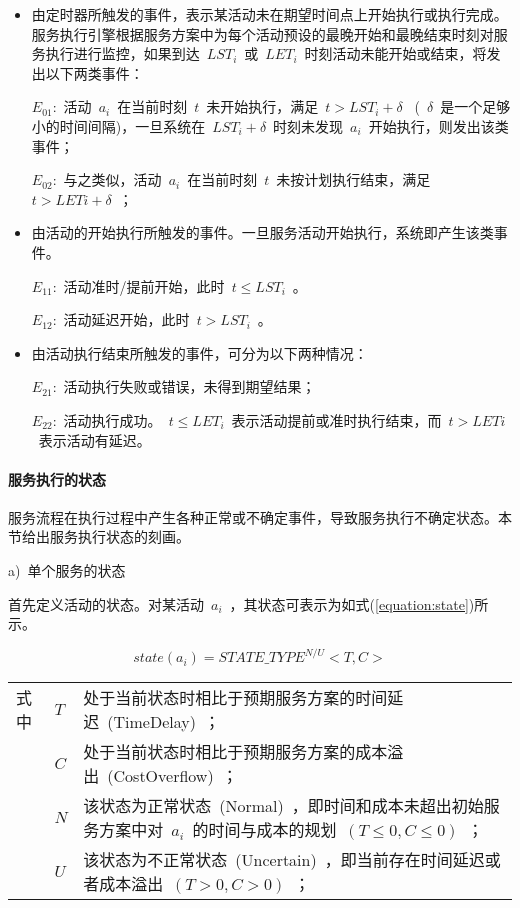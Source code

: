 \begin{itemize}
    \item 由定时器所触发的事件，表示某活动未在期望时间点上开始执行或执行完成。服务执行引擎根据服务方案中为每个活动预设的最晚开始和最晚结束时刻对服务执行进行监控，如果到达~$LST_i$~或~$LET_i$~时刻活动未能开始或结束，将发出以下两类事件：
    
    $E_{01}$:~活动~$a_i$~在当前时刻~$t$~未开始执行，满足~$t>LST_i+\delta$~ (~$\delta$~是一个足够小的时间间隔)，一旦系统在~$LST_i+\delta$~时刻未发现~$a_i$~开始执行，则发出该类事件；
    
    $E_{02}$:~与之类似，活动~$a_i$~在当前时刻~$t$~未按计划执行结束，满足~$t>LETi+\delta$~；
    
    \item 由活动的开始执行所触发的事件。一旦服务活动开始执行，系统即产生该类事件。
    
    $E_{11}$:~活动准时/提前开始，此时~$t\le LST_i$~。
    
    $E_{12}$:~活动延迟开始，此时~$t>LST_i$~。
    
    \item 由活动执行结束所触发的事件，可分为以下两种情况：
    
    $E_{21}$:~活动执行失败或错误，未得到期望结果；
    
    $E_{22}$:~活动执行成功。~$t\le LET_i$~表示活动提前或准时执行结束，而~$t>LETi$~表示活动有延迟。
    
\end{itemize}

\paragraph{服务执行的状态} \label{sec:service_state}

服务流程在执行过程中产生各种正常或不确定事件，导致服务执行不确定状态。本节给出服务执行状态的刻画。

a)~单个服务的状态

首先定义活动的状态。对某活动~$a_i$~，其状态可表示为如式(\ref{equation:state})所示。

\begin{equation}\label{equation:state}
state(a_i)=STATE\_TYPE^{N/U}<T, C>
\end{equation}
\begin{tabularx}{\textwidth}{@{}l@{\quad}l@{\pozhehao }X@{}}
    式中
    & $T$ & 处于当前状态时相比于预期服务方案的时间延迟~(TimeDelay)~；\\
    & $C$ & 处于当前状态时相比于预期服务方案的成本溢出~(CostOverflow)~；\\
    & $N$ & 该状态为正常状态~(Normal)~，即时间和成本未超出初始服务方案中对~$a_i$~的时间与成本的规划~$(T\le 0, C\le 0)$~；\\
    & $U$ & 该状态为不正常状态~(Uncertain)~，即当前存在时间延迟或者成本溢出~$(T>0, C>0)$~；
\end{tabularx}\vspace{\wordsep}

